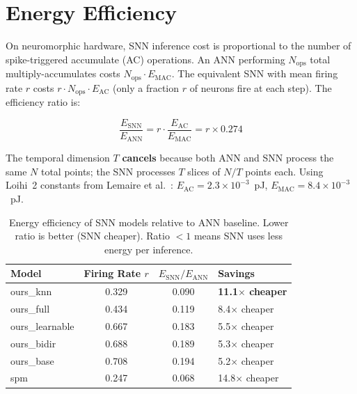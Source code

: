 \documentclass[11pt,a4paper]{article}
\begin{document}
\section{Energy Efficiency}

On neuromorphic hardware, SNN inference cost is proportional to the number of
spike-triggered accumulate (AC) operations. An ANN performing $N_\text{ops}$
total multiply-accumulates costs $N_\text{ops} \cdot E_\text{MAC}$. The
equivalent SNN with mean firing rate $r$ costs $r \cdot N_\text{ops} \cdot
E_\text{AC}$ (only a fraction $r$ of neurons fire at each step). The efficiency
ratio is:

\begin{equation}
  \frac{E_\text{SNN}}{E_\text{ANN}}
  = r \cdot \frac{E_\text{AC}}{E_\text{MAC}}
  = r \times 0.274
  \label{eq:energy}
\end{equation}

The temporal dimension $T$ \textbf{cancels} because both ANN and SNN process
the same $N$ total points; the SNN processes $T$ slices of $N/T$ points each.
Using Loihi~2 constants from Lemaire et al.~\cite{lemaire2022}:
$E_\text{AC} = 2.3 \times 10^{-3}$~pJ, $E_\text{MAC} = 8.4 \times 10^{-3}$~pJ.

\begin{table}[H]
  \centering
  \caption{Energy efficiency of SNN models relative to ANN baseline.
           Lower ratio is better (SNN cheaper). Ratio $< 1$ means
           SNN uses less energy per inference.}
  \label{tab:energy}
  \begin{tabular}{lccl}
    \toprule
    \textbf{Model} & \textbf{Firing Rate $r$} & \textbf{$E_\text{SNN}/E_\text{ANN}$} & \textbf{Savings} \\
    \midrule
    ours\_knn       & 0.329 & 0.090 & \textbf{11.1$\times$ cheaper} \\
    ours\_full      & 0.434 & 0.119 & 8.4$\times$ cheaper \\
    ours\_learnable & 0.667 & 0.183 & 5.5$\times$ cheaper \\
    ours\_bidir     & 0.688 & 0.189 & 5.3$\times$ cheaper \\
    ours\_base      & 0.708 & 0.194 & 5.2$\times$ cheaper \\
    spm             & 0.247 & 0.068 & 14.8$\times$ cheaper \\
    \bottomrule
  \end{tabular}
\end{table}
\end{document}
